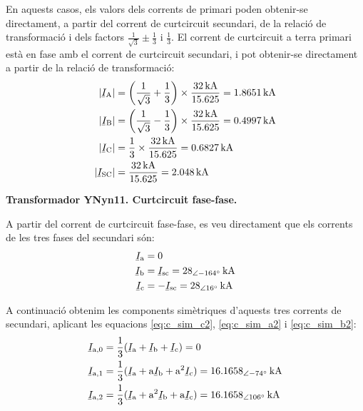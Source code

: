 \begin{exemple}
    En aquests casos, els valors dels corrents de primari poden obtenir-se directament, a partir del corrent de curtcircuit secundari, de la relació de transformació i dels factors $\frac{1}{\sqrt{3}} \pm \frac{1}{3}$ i $\frac{1}{3}$. El corrent de curtcircuit a terra primari està en fase amb el corrent de curtcircuit secundari, i pot obtenir-se directament a partir de la relació de transformació:
    \begin{align*}
        |\cmplx{I}\ped{A}| &= \left(\frac{1}{\sqrt{3}}+\frac{1}{3}\right) \times \frac{\qty{32}{kA}}{\num{15,625}} = \qty{1,8651}{kA} \\
        |\cmplx{I}\ped{B}| &= \left(\frac{1}{\sqrt{3}}-\frac{1}{3}\right) \times \frac{\qty{32}{kA}}{\num{15,625}} = \qty{0,4997}{kA} \\
        |\cmplx{I}\ped{C}| &= \frac{1}{3} \times \frac{\qty{32}{kA}}{\num{15,625}} = \qty{0,6827}{kA} \\
        |\cmplx{I}\ped{SC}| &= \frac{\qty{32}{kA}}{\num{15,625}} = \qty{2,048}{kA}
    \end{align*}


    \textbf{ Transformador YNyn11. Curtcircuit fase-fase.}

    \begin{center}
       
    \end{center}

    A partir del corrent de curtcircuit fase-fase, es veu directament que els corrents de les tres fases del secundari són:
    \begin{align*}
        \cmplx{I}\ped{a} &= 0  \\
        \cmplx{I}\ped{b} &= \cmplx{I}\ped{sc} = \qtypd{28}{-164}{kA}  \\
        \cmplx{I}\ped{c} &= -\cmplx{I}\ped{sc} = \qtypd{28}{16}{kA}
    \end{align*}

    A continuació obtenim les components simètriques d'aquests tres corrents de secundari, aplicant les equacions \eqref{eq:c_sim_c2}, \eqref{eq:c_sim_a2} i \eqref{eq:c_sim_b2}:
    \begin{align*}
        \cmplx{I}\ped{a,0} &= \frac{1}{3} (\cmplx{I}\ped{a} + \cmplx{I}\ped{b} +
        \cmplx{I}\ped{c}) = 0 \\
        \cmplx{I}\ped{a,1} &= \frac{1}{3} (\cmplx{I}\ped{a} + \au \cmplx{I}\ped{b} +
         \au^2 \cmplx{I}\ped{c}) = \qtypd{16,1658}{-74}{kA}  \\
        \cmplx{I}\ped{a,2} &= \frac{1}{3} (\cmplx{I}\ped{a} + \au^2 \cmplx{I}\ped{b} +
         \au \cmplx{I}\ped{c}) = \qtypd{16,1658}{106}{kA}
    \end{align*}


\end{exemple}
